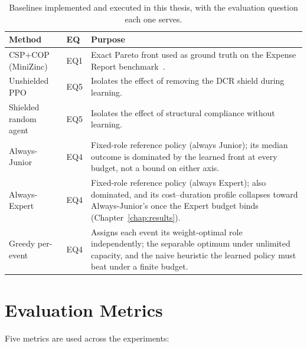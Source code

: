 \begin{table}[H]
\centering
\renewcommand{\arraystretch}{1.5}
\caption{Baselines implemented and executed in this thesis, with the
         evaluation question each one serves.}
\label{tab:implemented_baselines}
\begin{tabular}{@{}p{3.2cm} p{1.0cm} p{7.2cm}@{}}
\toprule
\textbf{Method} & \textbf{EQ} & \textbf{Purpose} \\
\midrule
CSP+COP (MiniZinc) & EQ1 &
Exact Pareto front used as ground truth on the Expense Report
benchmark~\cite{Diaz2024Pareto-OptimalModels}. \\
Unshielded \ac{PPO} & EQ5 &
Isolates the effect of removing the \ac{DCR} shield during learning. \\
Shielded random agent & EQ5 &
Isolates the effect of structural compliance without learning. \\
Always-Junior & EQ4 &
Fixed-role reference policy (always Junior); its median outcome is
dominated by the learned front at every budget, not a bound on either
axis. \\
Always-Expert & EQ4 &
Fixed-role reference policy (always Expert); also dominated, and its
cost--duration profile collapses toward Always-Junior's once the
Expert budget binds (Chapter~\ref{chap:results}). \\
Greedy per-event & EQ4 &
Assigns each event its weight-optimal role independently; the separable
optimum under unlimited capacity, and the naive heuristic the learned
policy must beat under a finite budget. \\
\bottomrule
\end{tabular}
\end{table}


\section{Evaluation Metrics}
\label{sec:metrics}

Five metrics are used across the experiments:


